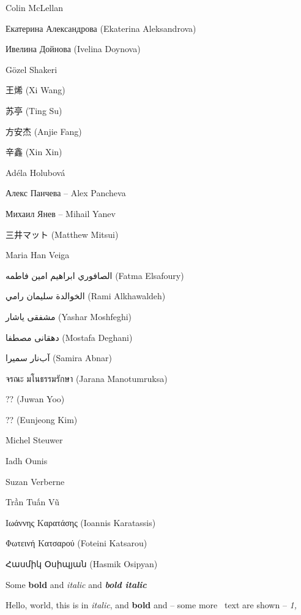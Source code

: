 
\begin{preamble}
{}

Colin McLellan

Екатерина Александрова (Ekaterina Aleksandrova)

Ивелина Дойнова (Ivelina Doynova)

G\"{o}zel Shakeri

王烯 (Xi Wang)

苏亭 (Ting Su)

方安杰 (Anjie Fang)

辛鑫 (Xin Xin)

Ad\'{e}la Holubov\'{a}

Алекс Панчева -- Alex Pancheva

Михаил Янев -- Mihail Yanev

三井マット (Matthew Mitsui)

Maria Han Veiga

{\arabicfont الصافوري ابراهيم امين فاطمه} (Fatma Elsafoury)

{\arabicfont  الخوالدة سليمان رامي} (Rami Alkhawaldeh)

{\farsifont مشفقى ياشار} (Yashar Moshfeghi)

{\farsifont دهقانی مصطفا} (Mostafa Deghani)

{\farsifont آب‌نار سمیرا} (Samira Abnar)

{\thaifont จรณะ มโนธรรมรักษา} (Jarana Manotumruksa)

?? (Juwan Yoo)

?? (Eunjeong Kim)

Michel Steuwer

Iadh Ounis

Suzan Verberne


Trần Tuấn Vũ

Ιωάννης Καρατάσης (Ioannis Karatassis)

Φωτεινή Κατσαρού (Foteini Katsarou)

{\armenianfont Հասմիկ Օսիպյան} (Hasmik Osipyan)

Some \textbf{bold} and \emph{italic} and \textbf{\emph{bold italic}}

{\metafont Hello, world, this is in \emph{italic}, and \textbf{bold} and -- some more \textemdash~text are shown – \emph{1,}}


\end{preamble}
